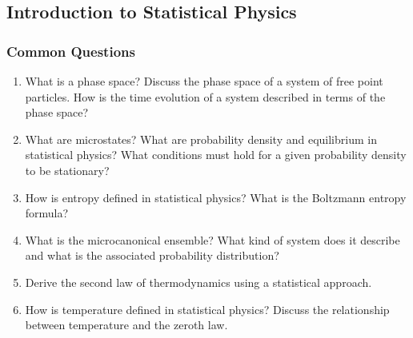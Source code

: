 \documentclass[11pt, a4paper]{article}
\begin{document}
\subsection{Introduction to Statistical Physics}
\subsubsection{Common Questions}
\begin{enumerate}
    \item What is a phase space? Discuss the phase space of a system of free point particles. How is the time evolution of a system described in terms of the phase space?

    \item What are microstates? What are probability density and equilibrium in statistical physics? What conditions must hold for a given probability density to be stationary?

    \item How is entropy defined in statistical physics? What is the Boltzmann entropy formula?

    \item What is the microcanonical ensemble? What kind of system does it describe and what is the associated probability distribution?

    \item Derive the second law of thermodynamics using a statistical approach.

    \item How is temperature defined in statistical physics? Discuss the relationship between temperature and the zeroth law.

\end{enumerate}
\end{document}
